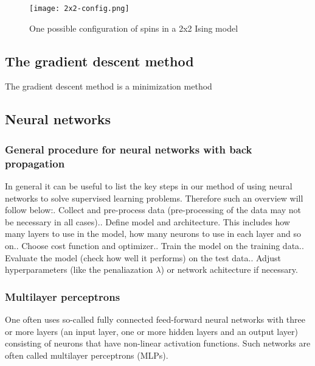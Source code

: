 \documentclass[a4paper,12pt]{article}
\begin{document}
\begin{figure}[h!]
  \centering
  \caption{One possible configuration of spins in a 2x2 Ising model}
  \texttt{[image: 2x2-config.png]}
\end{figure}

\subsection{The gradient descent method}
The gradient descent method is a minimization method

\subsection{Neural networks}

\subsubsection{General procedure for neural networks with back propagation}
In general it can be useful to list the key steps in our method of using neural networks to solve supervised learning problems. Therefore such an overview will follow below:. Collect and pre-process data (pre-processing of the data may not be necessary in all cases).. Define model and architecture. This includes how many layers to use in the model, how many neurons to use in each layer and so on.. Choose cost function and optimizer.. Train the model on the training data.. Evaluate the model (check how well it performs) on the test data.. Adjust hyperparameters (like the penaliazation $\lambda$) or network achitecture if necessary.

\subsubsection{Multilayer perceptrons}
One often uses so-called fully connected feed-forward neural networks with three or more layers (an input layer, one or more hidden layers and an output layer) consisting of neurons that have non-linear activation functions. Such networks are often called multilayer perceptrons (MLPs).\newline
\end{document}
